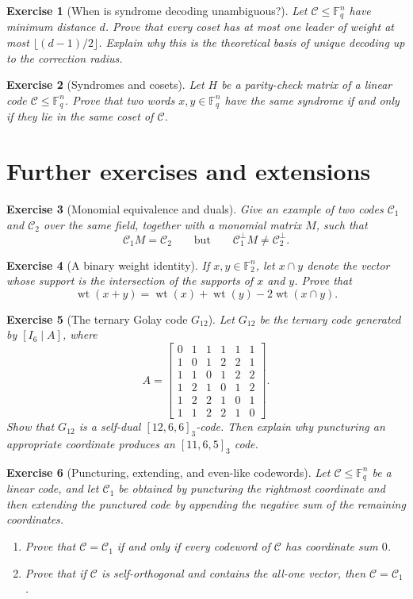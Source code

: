 \documentclass[11pt]{amsbook}
\theoremstyle{exstyle}
\newtheorem{exercise}{Exercise}
\theoremstyle{plain}
\newcommand{\F}{\mathbb{F}}
\newcommand{\Ccal}{\mathcal{C}}
\newcommand{\wt}{\operatorname{wt}}
\begin{document}
\begin{exercise}[When is syndrome decoding unambiguous?]
Let $\Ccal\leq\F_q^n$ have minimum distance $d$. Prove that every coset has at most one leader of weight at most $\lfloor (d-1)/2\rfloor$. Explain why this is the theoretical basis of unique decoding up to the correction radius.
\end{exercise}

\begin{exercise}[Syndromes and cosets]
Let $H$ be a parity-check matrix of a linear code $\Ccal\leq\F_q^n$. Prove that two words $x,y\in\F_q^n$ have the same syndrome if and only if they lie in the same coset of $\Ccal$.
\end{exercise}

\section{Further exercises and extensions}

\begin{exercise}[Monomial equivalence and duals]
Give an example of two codes $\Ccal_1$ and $\Ccal_2$ over the same field, together with a monomial matrix $M$, such that
\[
\Ccal_1M=\Ccal_2
\qquad\text{but}\qquad
\Ccal_1^{\perp}M\neq \Ccal_2^{\perp}.
\]
\end{exercise}

\begin{exercise}[A binary weight identity]
If $x,y\in\F_2^n$, let $x\cap y$ denote the vector whose support is the intersection of the supports of $x$ and $y$. Prove that
\[
\wt(x+y)=\wt(x)+\wt(y)-2\wt(x\cap y).
\]
\end{exercise}

\begin{exercise}[The ternary Golay code $G_{12}$]
Let $G_{12}$ be the ternary code generated by $[I_6\mid A]$, where
\[
A=
\begin{bmatrix}
0&1&1&1&1&1\\
1&0&1&2&2&1\\
1&1&0&1&2&2\\
1&2&1&0&1&2\\
1&2&2&1&0&1\\
1&1&2&2&1&0
\end{bmatrix}.
\]
Show that $G_{12}$ is a self-dual $[12,6,6]_3$-code. Then explain why puncturing an appropriate coordinate produces an $[11,6,5]_3$ code.
\end{exercise}

\begin{exercise}[Puncturing, extending, and even-like codewords]
Let $\Ccal\leq\F_q^n$ be a linear code, and let $\Ccal_1$ be obtained by puncturing the rightmost coordinate and then extending the punctured code by appending the negative sum of the remaining coordinates.
\begin{enumerate}[label=\textup{(\arabic*)}]
\item Prove that $\Ccal=\Ccal_1$ if and only if every codeword of $\Ccal$ has coordinate sum $0$.
\item Prove that if $\Ccal$ is self-orthogonal and contains the all-one vector, then $\Ccal=\Ccal_1$.
\end{enumerate}
\end{exercise}
\end{document}
